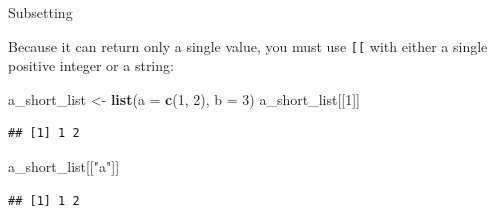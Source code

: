 \documentclass[ignorenonframetext,]{beamer}
\newenvironment{Shaded}{\begin{snugshade}}{\end{snugshade}}
\newcommand{\DataTypeTok}[1]{\textcolor[rgb]{0.13,0.29,0.53}{#1}}
\newcommand{\DecValTok}[1]{\textcolor[rgb]{0.00,0.00,0.81}{#1}}
\newcommand{\KeywordTok}[1]{\textcolor[rgb]{0.13,0.29,0.53}{\textbf{#1}}}
\newcommand{\NormalTok}[1]{#1}
\newcommand{\StringTok}[1]{\textcolor[rgb]{0.31,0.60,0.02}{#1}}
\begin{document}
\begin{frame}[fragile]{Subsetting}
\protect\hypertarget{subsetting-4}{}

Because it can return only a single value, you must use \texttt{{[}{[}}
with either a single positive integer or a string:

\begin{Shaded}
\begin{Highlighting}[]
\NormalTok{a_short_list <-}\StringTok{ }\KeywordTok{list}\NormalTok{(}\DataTypeTok{a =} \KeywordTok{c}\NormalTok{(}\DecValTok{1}\NormalTok{, }\DecValTok{2}\NormalTok{), }\DataTypeTok{b =} \DecValTok{3}\NormalTok{)}
\NormalTok{a_short_list[[}\DecValTok{1}\NormalTok{]]}
\end{Highlighting}
\end{Shaded}

\begin{verbatim}
## [1] 1 2
\end{verbatim}

\begin{Shaded}
\begin{Highlighting}[]
\NormalTok{a_short_list[[}\StringTok{"a"}\NormalTok{]]}
\end{Highlighting}
\end{Shaded}

\begin{verbatim}
## [1] 1 2
\end{verbatim}

\end{frame}
\end{document}
